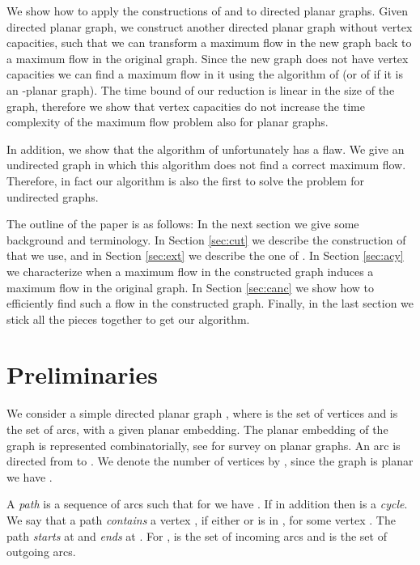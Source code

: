 \documentclass[a4paper,11pt]{article}
\begin{document}
We show how to apply the constructions of \cite{KN94} and \cite{ZLC08}
to directed planar graphs.
Given directed planar graph, we construct another directed planar graph
without vertex capacities, such that we can transform a maximum flow
in the new graph  back to a maximum flow in the original graph.
Since the new graph does not have vertex capacities we can find a
maximum flow in it using  the algorithm of \cite{BK} (or of
\cite{H81} if it is an -planar graph). The time bound of our
reduction is linear in the size of the graph, therefore we show that
vertex capacities do not increase the time complexity of the maximum
flow problem also for planar graphs.



In addition, we show that the algorithm of \cite{ZLC08}
unfortunately has a flaw. We give an undirected graph in  which this
algorithm does not find a correct maximum flow. Therefore, in fact our
algorithm is also the first to solve the problem for undirected
graphs.

The outline of the paper is as follows: In the next  section we give
some background and terminology. In Section \ref{sec:cut} we
describe the construction of \cite{KN94} that we use, and in Section
\ref{sec:ext} we describe the one of \cite{ZLC08}. In Section
\ref{sec:acy} we characterize when a maximum flow in the constructed graph
induces a maximum flow in the original graph. In Section
\ref{sec:canc} we show how to efficiently find such a flow in the
constructed graph.  Finally, in the last section we stick all the
pieces together to get our algorithm.

\section{Preliminaries}

We consider a simple directed planar graph  , where 
is the set of vertices and  is the set of arcs, with a given
planar embedding. The planar embedding of the graph  is
represented combinatorially, see \cite{NC88}
for survey on planar graphs. An arc  is directed
from  to . We denote the number of vertices by
, since  the graph is planar we have .

A \emph{path}  is a sequence of arcs  such that for  we have . If in addition  then  is a \emph{cycle}. We say that a path  \emph{contains} a vertex , if either  or  is in , for some vertex . The path  \emph{starts} at  and \emph{ends} at .
For ,  is the set of incoming arcs and  is the set of outgoing arcs.
\end{document}
